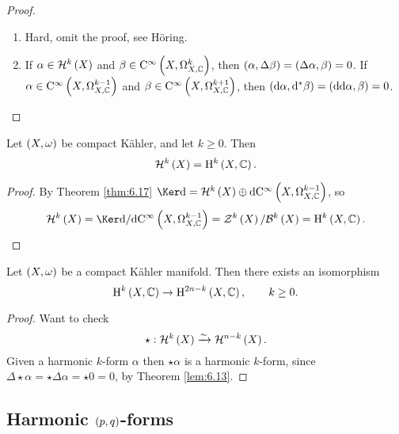 \begin{proof}
\hfill
\begin{enumerate}
\item Hard, omit the proof, see H\"oring.
\item If $ \alpha \in \HHH^k\br{X} $ and $ \beta \in \C^\infty\br{X, \Omega_{X, \CC}^k} $, then $ \br{\alpha, \Delta\beta} = \br{\Delta\alpha, \beta} = 0 $. If $ \alpha \in \C^\infty\br{X, \Omega_{X, \CC}^{k - 1}} $ and $ \beta \in \C^\infty\br{X, \Omega_{X, \CC}^{k + 1}} $, then $ \br{\d\alpha, \d^*\beta} = \br{\d\d\alpha, \beta} = 0 $.
\end{enumerate}
\end{proof}

\pagebreak

\begin{theorem}
\label{thm:6.18}
Let $ \br{X, \omega} $ be compact K\"ahler, and let $ k \ge 0 $. Then
$$ \HHH^k\br{X} = \H^k\br{X, \CC}. $$
\end{theorem}

\begin{proof}
By Theorem \ref{thm:6.17} $ \Ker \d = \HHH^k\br{X} \oplus \d\C^\infty\br{X, \Omega_{X, \CC}^{k - 1}} $, so
$$ \HHH^k\br{X} = \Ker \d / \d\C^\infty\br{X, \Omega_{X, \CC}^{k - 1}} = \ZZZ^k\br{X} / \BBB^k\br{X} = \H^k\br{X, \CC}. $$
\end{proof}

\begin{theorem}
Let $ \br{X, \omega} $ be a compact K\"ahler manifold. Then there exists an isomorphism
$$ \H^k\br{X, \CC} \to \H^{2n - k}\br{X, \CC}, \qquad k \ge 0. $$
\end{theorem}

\begin{proof}
Want to check
$$ \star : \HHH^k\br{X} \xrightarrow{\sim} \HHH^{n - k}\br{X}. $$
Given a harmonic $ k $-form $ \alpha $ then $ \star\alpha $ is a harmonic $ k $-form, since $ \Delta\star\alpha = \star\Delta\alpha = \star 0 = 0 $, by Theorem \ref{lem:6.13}.
\end{proof}

\subsection{Harmonic \texorpdfstring{$ \br{p, q} $}{(p, q)}-forms}


